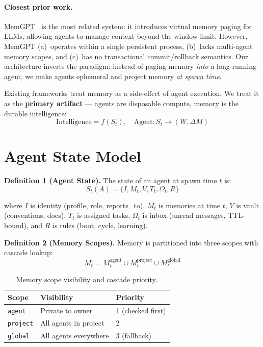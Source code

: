 \documentclass{article}
\begin{document}
\paragraph{Closest prior work.} MemGPT~\citep{packer2023memgpt} is the most related system: it introduces virtual memory paging for LLMs, allowing agents to manage context beyond the window limit. However, MemGPT (a)~operates within a single persistent process, (b)~lacks multi-agent memory scopes, and (c)~has no transactional commit/rollback semantics. Our architecture inverts the paradigm: instead of paging memory \emph{into} a long-running agent, we make agents ephemeral and project memory \emph{at spawn time}.

Existing frameworks treat memory as a side-effect of agent execution. We treat it as the \textbf{primary artifact} --- agents are disposable compute, memory is the durable intelligence:
$$\text{Intelligence} = f(S_t), \quad \text{Agent} : S_t \to (W, \Delta M)$$

\section{Agent State Model}

\textbf{Definition 1 (Agent State).} The state of an agent at spawn time $t$ is:
$$S_t(A) = \{ I, M_t, V, T_t, \Omega_t, R \}$$

where $I$ is identity (profile, role, reports\_to), $M_t$ is memories at time $t$, $V$ is vault (conventions, docs), $T_t$ is assigned tasks, $\Omega_t$ is inbox (unread messages, TTL-bound), and $R$ is rules (boot, cycle, learning).

\textbf{Definition 2 (Memory Scopes).} Memory is partitioned into three scopes with cascade lookup:
$$M_t = M_t^{\text{agent}} \cup M_t^{\text{project}} \cup M_t^{\text{global}}$$

\begin{table}[h]
\centering
\caption{Memory scope visibility and cascade priority.}
\begin{tabular}{@{}lll@{}}
\toprule
\textbf{Scope} & \textbf{Visibility} & \textbf{Priority} \\
\midrule
\texttt{agent} & Private to owner & 1 (checked first) \\
\texttt{project} & All agents in project & 2 \\
\texttt{global} & All agents everywhere & 3 (fallback) \\
\bottomrule
\end{tabular}
\end{table}
\end{document}
